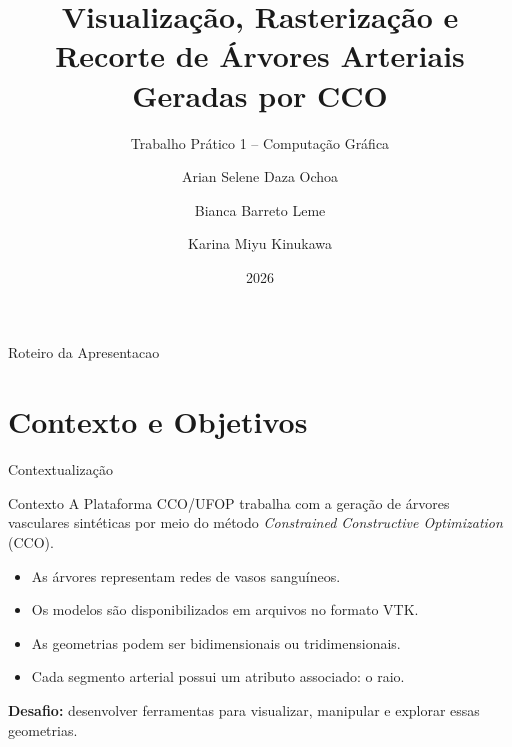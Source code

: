 \documentclass[aspectratio=169,11pt]{beamer}
\title[Visualização CCO -- Computação Gráfica]
{Visualização, Rasterização e Recorte de Árvores Arteriais Geradas por CCO}
\subtitle{Trabalho Prático 1 -- Computação Gráfica}
\author{
Arian Selene Daza Ochoa \and
Bianca Barreto Leme \and
Karina Miyu Kinukawa
}
\institute[UFOP]{
Departamento de Computação (DECOM)\\
Universidade Federal de Ouro Preto
}
\date{2026}
\begin{document}
\begin{frame}
\titlepage
\end{frame}


\begin{frame}{Roteiro da Apresentacao}
\tableofcontents
\end{frame}

\section{Contexto e Objetivos}

\begin{frame}{Contextualização}
\begin{block}{Contexto}
A Plataforma CCO/UFOP trabalha com a geração de árvores
vasculares sintéticas por meio do método
\textit{Constrained Constructive Optimization} (CCO).
\end{block}

\vspace{0.3cm}

\begin{itemize}
    \item As árvores representam redes de vasos sanguíneos.
    \item Os modelos são disponibilizados em arquivos no formato VTK.
    \item As geometrias podem ser bidimensionais ou tridimensionais.
    \item Cada segmento arterial possui um atributo associado: o raio.
\end{itemize}

\vspace{0.2cm}
\begin{center}
\textbf{Desafio:} desenvolver ferramentas para visualizar,
manipular e explorar essas geometrias.
\end{center}
\end{frame}
\end{document}
